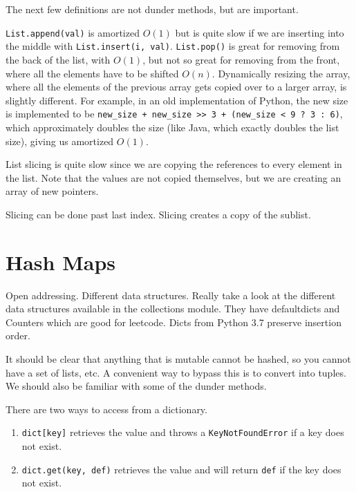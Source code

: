 \documentclass{article}
\begin{document}
  The next few definitions are not dunder methods, but are important. 
  \begin{definition}
    \texttt{List.append(val)} is amortized $O(1)$ but is quite slow if we are inserting into the middle with \texttt{List.insert(i, val)}. 
    \texttt{List.pop()} is great for removing from the back of the list, with $O(1)$, but not so great for removing from the front, where all the elements have to be shifted $O(n)$. 
    Dynamically resizing the array, where all the elements of the previous array gets copied over to a larger array, is slightly different. For example, in an old implementation of Python, the new size is implemented to be \texttt{new\_size + new\_size >> 3 + (new\_size < 9 ? 3 : 6)}, which approximately doubles the size (like Java, which exactly doubles the list size), giving us amortized $O(1)$. 
  \end{definition}

  \begin{definition}[Extend]
    
  \end{definition}

  \begin{definition}[Sort]
    
  \end{definition}

  List slicing is quite slow since we are copying the references to every element in the list. Note that the values are not copied themselves, but we are creating an array of new pointers. 

  Slicing can be done past last index. Slicing creates a copy of the sublist. 

\section{Hash Maps}

  Open addressing. Different data structures. Really take a look at the different data structures available in the collections module. They have defaultdicts and Counters which are good for leetcode. Dicts from Python 3.7 preserve insertion order. 

  It should be clear that anything that is mutable cannot be hashed, so you cannot have a set of lists, etc. A convenient way to bypass this is to convert into tuples. We should also be familiar with some of the dunder methods. 

  \begin{definition}[Get]
    There are two ways to access from a dictionary. 
    \begin{enumerate}
      \item \texttt{dict[key]} retrieves the value and throws a \texttt{KeyNotFoundError} if a key does not exist. 
      \item \texttt{dict.get(key, def)} retrieves the value and will return \texttt{def} if the key does not exist. 
    \end{enumerate}
  \end{definition}
\end{document}
